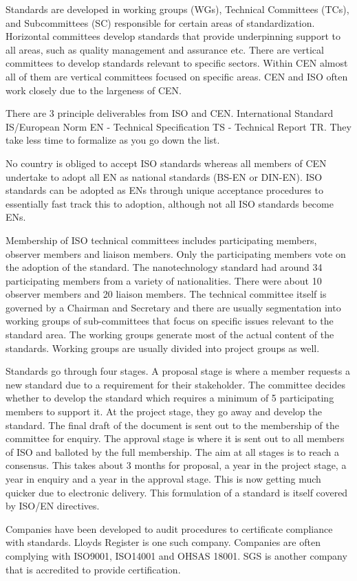 Standards are developed in working groups (WGs), Technical Committees (TCs), and Subcommittees (SC) responsible for certain areas of standardization. 
Horizontal committees develop standards that provide underpinning support to all areas, such as quality management and assurance etc. 
There are vertical committees to develop standards relevant to specific sectors. 
Within CEN almost all of them are vertical committees focused on specific areas. 
CEN and ISO often work closely due to the largeness of CEN.

There are 3 principle deliverables from ISO and CEN.
 International Standard IS/European Norm EN - Technical Specification TS - Technical Report TR. 
They take less time to formalize as you go down the list.

No country is obliged to accept ISO standards whereas all members of CEN undertake to adopt all EN as national standards (BS-EN or DIN-EN). 
ISO standards can be adopted as ENs through unique acceptance procedures to essentially fast track this to adoption, although not all ISO standards become ENs.

Membership of ISO technical committees includes participating members, observer members and liaison members. 
Only the participating members vote on the adoption of the standard. 
The nanotechnology standard had around 34 participating members from a variety of nationalities.
 There were about 10 observer members and 20 liaison members. 
The technical committee itself is governed by a Chairman and Secretary and there are usually segmentation into working groups of sub-committees that focus on specific issues relevant to the standard area. 
The working groups generate most of the actual content of the standards. 
Working groups are usually divided into project groups as well.

Standards go through four stages. 
A proposal stage is where a member requests a new standard due to a requirement for their stakeholder. 
The committee decides whether to develop the standard which requires a minimum of 5 participating members to support it. 
At the project stage, they go away and develop the standard. 
The final draft of the document is sent out to the membership of the committee for enquiry.
 The approval stage is where it is sent out to all members of ISO and balloted by the full membership. 
The aim at all stages is to reach a consensus. 
This takes about 3 months for proposal, a year in the project stage, a year in enquiry and a year in the approval stage. 
This is now getting much quicker due to electronic delivery. 
This formulation of a standard is itself covered by ISO/EN directives.

Companies have been developed to audit procedures to certificate compliance with standards. 
Lloyds Register is one such company. 
Companies are often complying with ISO9001, ISO14001 and OHSAS 18001. 
SGS is another company that is accredited to provide certification. 




